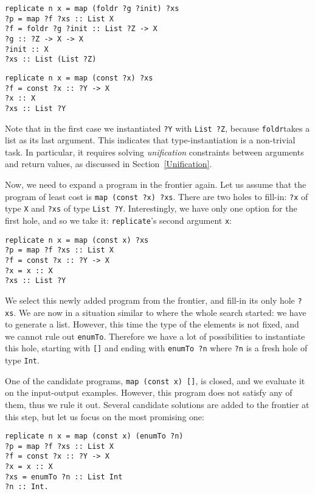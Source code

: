 \begin{lstlisting}[style=plain]
replicate n x = map (foldr ?g ?init) ?xs
?p = map ?f ?xs :: List X
?f = foldr ?g ?init :: List ?Z -> X
?g :: ?Z -> X -> X
?init :: X
?xs :: List (List ?Z)
\end{lstlisting}

\begin{lstlisting}[style=plain]
replicate n x = map (const ?x) ?xs
?f = const ?x :: ?Y -> X
?x :: X
?xs :: List ?Y
\end{lstlisting}
Note that in the first case we instantiated \lstinline|?Y| with \lstinline|List ?Z|, because \lstinline|foldr|takes a list as its last argument.  This indicates that type-instantiation is a non-trivial task.  In particular, it requires solving \emph{unification} constraints between arguments and return values, as discussed in Section~\ref{Unification}.

Now, we need to expand a program in the frontier again.  Let us assume that the program of least cost is \lstinline|map (const ?x) ?xs|.  There are two holes to fill-in: \lstinline|?x| of type \lstinline|X| and \lstinline|?xs| of type \lstinline|List ?Y|.  Interestingly, we have only one option for the first hole, and so we take it: \lstinline|replicate|'s second argument \lstinline|x|:
\begin{lstlisting}[style=plain]
replicate n x = map (const x) ?xs
?p = map ?f ?xs :: List X
?f = const ?x :: ?Y -> X
?x = x :: X
?xs :: List ?Y
\end{lstlisting}

We select this newly added program from the frontier, and fill-in its only hole \lstinline|?xs|.  We are now in a situation similar to where the whole search started: we have to generate a list.  However, this time the type of the elements is not fixed, and we cannot rule out \lstinline|enumTo|.  Therefore we have a lot of possibilities to instantiate this hole, starting with \lstinline|[]| and ending with \lstinline|enumTo ?n| where \lstinline|?n| is a fresh hole of type \lstinline|Int|.

One of the candidate programs, \lstinline|map (const x) []|, is closed, and we evaluate it on the input-output examples.  However, this program does not satisfy any of them, thus we rule it out.  Several candidate solutions are added to the frontier at this step, but let us focus on the most promising one:
\begin{lstlisting}[style=plain]
replicate n x = map (const x) (enumTo ?n)
?p = map ?f ?xs :: List X
?f = const ?x :: ?Y -> X
?x = x :: X
?xs = enumTo ?n :: List Int
?n :: Int.
\end{lstlisting}

